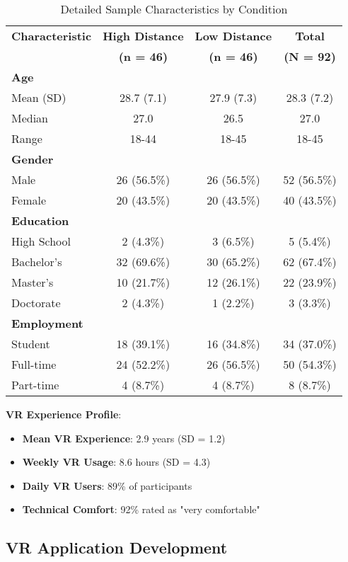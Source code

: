\documentclass[12pt]{article}
\begin{document}
\begin{table}[h]
\centering
\caption{Detailed Sample Characteristics by Condition}
\begin{tabular}{@{}lccc@{}}
\toprule
\textbf{Characteristic} & \textbf{High Distance} & \textbf{Low Distance} & \textbf{Total} \\
& \textbf{(n = 46)} & \textbf{(n = 46)} & \textbf{(N = 92)} \\
\midrule
\textbf{Age} & & & \\
Mean (SD) & 28.7 (7.1) & 27.9 (7.3) & 28.3 (7.2) \\
Median & 27.0 & 26.5 & 27.0 \\
Range & 18-44 & 18-45 & 18-45 \\
\midrule
\textbf{Gender} & & & \\
Male & 26 (56.5\%) & 26 (56.5\%) & 52 (56.5\%) \\
Female & 20 (43.5\%) & 20 (43.5\%) & 40 (43.5\%) \\
\midrule
\textbf{Education} & & & \\
High School & 2 (4.3\%) & 3 (6.5\%) & 5 (5.4\%) \\
Bachelor's & 32 (69.6\%) & 30 (65.2\%) & 62 (67.4\%) \\
Master's & 10 (21.7\%) & 12 (26.1\%) & 22 (23.9\%) \\
Doctorate & 2 (4.3\%) & 1 (2.2\%) & 3 (3.3\%) \\
\midrule
\textbf{Employment} & & & \\
Student & 18 (39.1\%) & 16 (34.8\%) & 34 (37.0\%) \\
Full-time & 24 (52.2\%) & 26 (56.5\%) & 50 (54.3\%) \\
Part-time & 4 (8.7\%) & 4 (8.7\%) & 8 (8.7\%) \\
\bottomrule
\end{tabular}
\end{table}

\textbf{VR Experience Profile}:
\begin{itemize}
    \item \textbf{Mean VR Experience}: 2.9 years (SD = 1.2)
    \item \textbf{Weekly VR Usage}: 8.6 hours (SD = 4.3)
    \item \textbf{Daily VR Users}: 89\% of participants
    \item \textbf{Technical Comfort}: 92\% rated as "very comfortable"
\end{itemize}

\subsection{VR Application Development}
\end{document}
